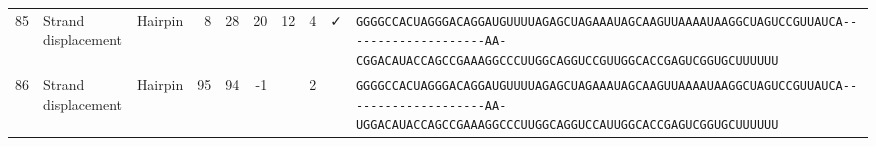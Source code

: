 \begin{tabular}{rllrrrrrcl}
 85 & Strand displacement & Hairpin & 8 & 28 & 20 & 12 & 4 & ✓ &                                                                                                                                                   
 \color{ucsfdarkgrey}\verb|GGGGCCACUAGGGACAGGAU|\color{ucsforange}\verb|GUUUUA|\color{ucsfblue}\verb|GAGCUAGAAAUAGCAAGU|\color{ucsforange}\verb|UAAAAUAA|\color{ucsfnavy}\verb|GGCUAGUCC|\color{ucsforange}\verb|GUUAUCA|\color{ucsfteal}\verb|--------------------AA-CGGAC|\color{ucsfpurple}\verb|AUACCAGCCGAAAGGCCCUUGGCAG|\color{ucsfteal}\verb|GUCCGUU|\color{ucsforange}\verb|GGCACCGAGUCGGUGCUUUUUU| \\
                                                                                                                                                                                                                   
 86 & Strand displacement & Hairpin & 95 & 94 & -1 &   & 2 &  &                                                                                                                                                    
 \color{ucsfdarkgrey}\verb|GGGGCCACUAGGGACAGGAU|\color{ucsforange}\verb|GUUUUA|\color{ucsfblue}\verb|GAGCUAGAAAUAGCAAGU|\color{ucsforange}\verb|UAAAAUAA|\color{ucsfnavy}\verb|GGCUAGUCC|\color{ucsforange}\verb|GUUAUCA|\color{ucsfteal}\verb|--------------------AA-UGGAC|\color{ucsfpurple}\verb|AUACCAGCCGAAAGGCCCUUGGCAG|\color{ucsfteal}\verb|GUCCAUU|\color{ucsforange}\verb|GGCACCGAGUCGGUGCUUUUUU| \\

\bottomrule
\end{tabular}
